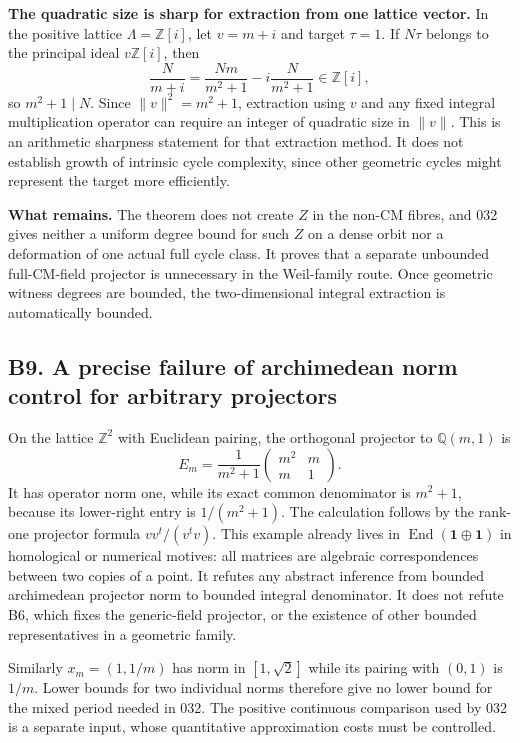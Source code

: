 \textbf{The quadratic size is sharp for extraction from one lattice vector.} In the positive lattice \(\Lambda=\mathbb Z[i]\), let \(v=m+i\) and target \(\tau=1\). If \(N\tau\) belongs to the principal ideal \(v\mathbb Z[i]\), then \[
 \frac{N}{m+i}=\frac{Nm}{m^2+1}-i\frac{N}{m^2+1}\in\mathbb Z[i],
\] so \(m^2+1\mid N\). Since \(\|v\|^2=m^2+1\), extraction using \(v\) and any fixed integral multiplication operator can require an integer of quadratic size in \(\|v\|\). This is an arithmetic sharpness statement for that extraction method. It does not establish growth of intrinsic cycle complexity, since other geometric cycles might represent the target more efficiently.

\textbf{What remains.} The theorem does not create \(Z\) in the non-CM fibres, and 032 gives neither a uniform degree bound for such \(Z\) on a dense orbit nor a deformation of one actual full cycle class. It proves that a separate unbounded full-CM-field projector is unnecessary in the Weil-family route. Once geometric witness degrees are bounded, the two-dimensional integral extraction is automatically bounded.

\subsection{B9. A precise failure of archimedean norm control for arbitrary projectors}\label{b9.-a-precise-failure-of-archimedean-norm-control-for-arbitrary-projectors}

On the lattice \(\mathbb Z^2\) with Euclidean pairing, the orthogonal projector to \(\mathbb Q(m,1)\) is \[
 E_m=\frac1{m^2+1}\begin{pmatrix}m^2&m\\m&1\end{pmatrix}.
\] It has operator norm one, while its exact common denominator is \(m^2+1\), because its lower-right entry is \(1/(m^2+1)\). The calculation follows by the rank-one projector formula \(vv^t/(v^tv)\). This example already lives in \(\operatorname{End}(\mathbf1\oplus\mathbf1)\) in homological or numerical motives: all matrices are algebraic correspondences between two copies of a point. It refutes any abstract inference from bounded archimedean projector norm to bounded integral denominator. It does not refute B6, which fixes the generic-field projector, or the existence of other bounded representatives in a geometric family.

Similarly \(x_m=(1,1/m)\) has norm in \([1,\sqrt2]\) while its pairing with \((0,1)\) is \(1/m\). Lower bounds for two individual norms therefore give no lower bound for the mixed period needed in 032. The positive continuous comparison used by 032 is a separate input, whose quantitative approximation costs must be controlled.

